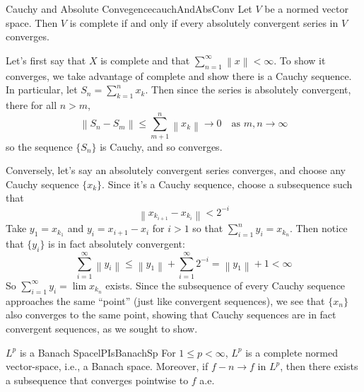 \documentclass[oneside]{book}
\newcommand{\rw}{\rightarrow}
\begin{document}
\begin{lem}{Cauchy and Absolute Convegence}{cauchAndAbsConv}
	Let $V$ be a normed vector space. Then $V$ is complete if and only if every absolutely convergent series in $V$
	converges. 
\end{lem}

\begin{Proof}
	Let's first say that $X$ is complete and that $\sum_{n=1}^\infty \left\| x\right\| < \infty$. To show it converges,
	we take advantage of complete and show there is a Cauchy sequence. In particular, let $S_n = \sum_{k=1}^n x_k$. Then
	since the series is absolutely convergent, there for all $n > m$, 
	\[
		\left\| S_n - S_m\right\| \le \sum_{m+1}^n \left\| x_k\right\| \rw 0 \quad\text{as $m,n \rw \infty$}
	\]
	so the sequence $\{S_n\}$ is Cauchy, and so converges. 

	Conversely, let's say an absolutely convergent series converges, and choose any Cauchy sequence $\{x_k\}$. Since
	it's a Cauchy sequence, choose a subsequence such that
	\[
		\left\| x_{k_{i+1}} - x_{k_i}\right\| < 2^{-i}
	\]
	Take $y_1 = x_{k_1}$ and $y_i = x_{i+1} - x_i$ for $i>1$ so that $\sum_{i=1}^n y_i = x_{k_n}$. Then notice that
	$\{y_i\}$ is in fact absolutely convergent:
	\[
		\sum_{i=1}^\infty \left\| y_i\right\| \le \left\| y_1\right\| + \sum_{i=1}^\infty 2^{-i} = \left\| y_1\right\|
		+ 1 < \infty
	\]
	So $\sum_{i=1}^\infty y_i = \lim x_{k_n}$ exists. Since the subsequence of every Cauchy sequence approaches the same
	``point'' (just like convergent sequences), we see that $\{x_n\}$ also converges to the same point, showing that
	Cauchy sequences are in fact convergent sequences, as we sought to show. 
\end{Proof}

\begin{thm}{$L^p$ is a Banach Space}{lPIsBanachSp}
	For $1 \le p < \infty$, $L^p$ is a complete normed vector-space, i.e., a Banach space. Moreover, if $f-n \rw f$ in
	$L^p$, then there exists a subsequence that converges pointwise to $f$ a.e.
\end{thm}
\end{document}
